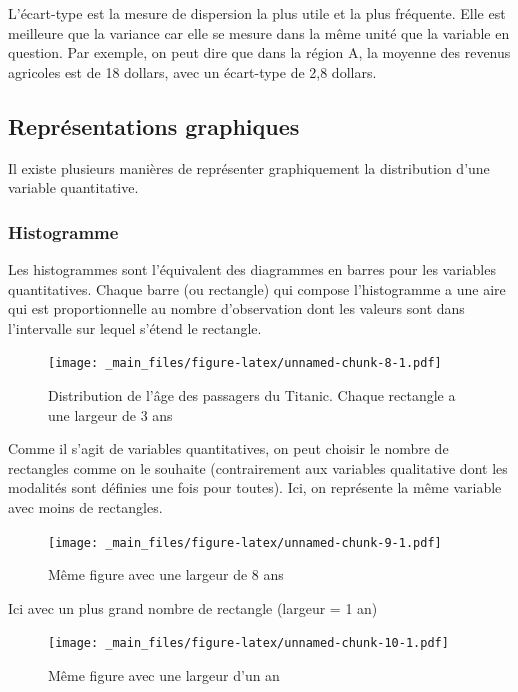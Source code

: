 \documentclass[
  french,
]{book}
\begin{document}
L'écart-type est la mesure de dispersion la plus utile et la plus fréquente. Elle est meilleure que la variance car elle se mesure dans la même unité que la variable en question. Par exemple, on peut dire que dans la région A, la moyenne des revenus agricoles est de 18 dollars, avec un écart-type de 2,8 dollars.

\hypertarget{repruxe9sentations-graphiques}{%
\subsection{Représentations graphiques}\label{repruxe9sentations-graphiques}}

Il existe plusieurs manières de représenter graphiquement la distribution d'une variable quantitative.

\hypertarget{histogramme}{%
\subsubsection{Histogramme}\label{histogramme}}

Les histogrammes sont l'équivalent des diagrammes en barres pour les variables quantitatives. Chaque barre (ou rectangle) qui compose l'histogramme a une aire qui est proportionnelle au nombre d'observation dont les valeurs sont dans l'intervalle sur lequel s'étend le rectangle.

\begin{figure}
\centering
\texttt{[image: \_main\_files/figure-latex/unnamed-chunk-8-1.pdf]}
\caption{\label{fig:unnamed-chunk-8}Distribution de l'âge des passagers du Titanic. Chaque rectangle a une largeur de 3 ans}
\end{figure}

Comme il s'agit de variables quantitatives, on peut choisir le nombre de rectangles comme on le souhaite (contrairement aux variables qualitative dont les modalités sont définies une fois pour toutes). Ici, on représente la même variable avec moins de rectangles.

\begin{figure}
\centering
\texttt{[image: \_main\_files/figure-latex/unnamed-chunk-9-1.pdf]}
\caption{\label{fig:unnamed-chunk-9}Même figure avec une largeur de 8 ans}
\end{figure}

Ici avec un plus grand nombre de rectangle (largeur = 1 an)

\begin{figure}
\centering
\texttt{[image: \_main\_files/figure-latex/unnamed-chunk-10-1.pdf]}
\caption{\label{fig:unnamed-chunk-10}Même figure avec une largeur d'un an}
\end{figure}
\end{document}
